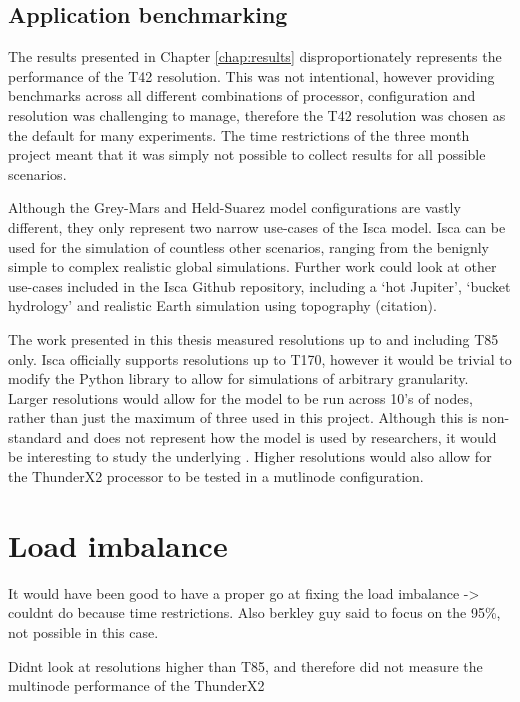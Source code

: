 \documentclass[a4paper,11pt]{report}
\begin{document}
\subsection{Application benchmarking}
The results presented in Chapter \ref{chap:results} disproportionately represents the performance of the T42 resolution. This was not intentional, however providing benchmarks across all different combinations of processor, configuration and resolution was challenging to manage, therefore the T42 resolution was chosen as the default for many experiments. The time restrictions of the three month project meant that it was simply not possible to collect results for all possible scenarios. 
\par
Although the Grey-Mars and Held-Suarez model configurations are vastly different, they only represent two narrow use-cases of the Isca model. Isca can be used for the simulation of countless other scenarios, ranging from the benignly simple to complex realistic global simulations. Further work could look at other use-cases included in the Isca Github repository, including a `hot Jupiter', `bucket hydrology' and realistic Earth simulation using topography (citation). 
\par
The work presented in this thesis measured resolutions up to and including T85 only. Isca officially supports resolutions up to T170, however it would be trivial to modify the Python library to allow for simulations of arbitrary granularity. Larger resolutions would allow for the model to be run across 10's of nodes, rather than just the maximum of three used in this project. Although this is non-standard and does not represent how the model is used by researchers, it would be interesting to study the underlying . Higher resolutions would also allow for the ThunderX2 processor to be tested in a mutlinode configuration.
 
 \section{Load imbalance}
 It would have been good to have a proper go at fixing the load imbalance -> couldnt do because time restrictions. Also berkley guy said to focus on the 95\%, not possible in this case. 

\par

\par
Didnt look at resolutions higher than T85, and therefore did not measure the multinode performance of the ThunderX2
\end{document}
